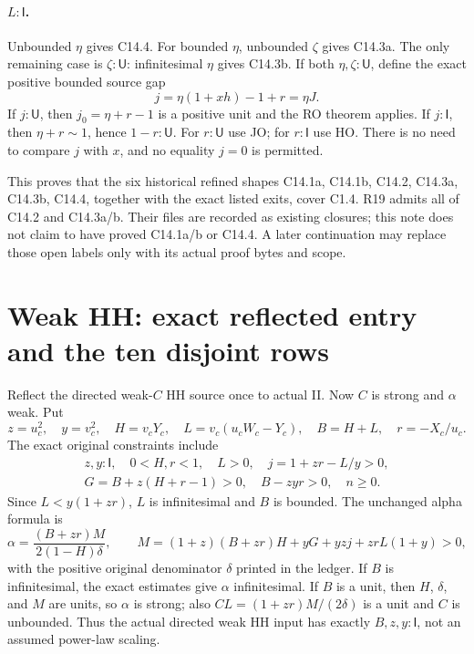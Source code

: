 \documentclass[11pt]{article}
\newcommand{\I}{\mathsf I}
\newcommand{\U}{\mathsf U}
\begin{document}
\paragraph{$L:\I$.}
Unbounded $\eta$ gives C14.4. For bounded $\eta$, unbounded $\zeta$
gives C14.3a. The only remaining case is $\zeta:\U$: infinitesimal
$\eta$ gives C14.3b. If both $\eta,\zeta:\U$, define the exact
positive bounded source gap
\[
j=\eta(1+xh)-1+r=\eta J.
\]
If $j:\U$, then $j_0=\eta+r-1$ is a positive unit and the RO theorem
applies. If $j:\I$, then $\eta+r\sim1$, hence $1-r:\U$.
For $r:\U$ use JO; for $r:\I$ use HO. There is no need to compare
$j$ with $x$, and no equality $j=0$ is permitted.

This proves that the six historical refined shapes
C14.1a, C14.1b, C14.2, C14.3a, C14.3b, C14.4, together with the exact
listed exits, cover C1.4. R19 admits all of C14.2 and C14.3a/b.
Their files are recorded as existing closures; this note does not claim
to have proved C14.1a/b or C14.4. A later continuation may replace
those open labels only with its actual proof bytes and scope.

\section{Weak HH: exact reflected entry and the ten disjoint rows}

Reflect the directed weak-$C$ HH source once to actual II. Now $C$
is strong and $\alpha$ weak. Put
\[
z=u_c^2,\quad y=v_c^2,\quad H=v_cY_c,\quad
L=v_c(u_cW_c-Y_c),\quad B=H+L,\quad r=-X_c/u_c.
\]
The exact original constraints include
\begin{gather*}
z,y:\I,\quad 0<H,r<1,\quad L>0,\quad j=1+zr-L/y>0,\\
G=B+z(H+r-1)>0,\quad B-zyr>0,\quad n\ge0.
\end{gather*}
Since $L<y(1+zr)$, $L$ is infinitesimal and $B$ is bounded.
The unchanged alpha formula is
\[
\alpha=\frac{(B+zr)M}{2(1-H)\delta},\qquad
M=(1+z)(B+zr)H+yG+yzj+zrL(1+y)>0,
\]
with the positive original denominator $\delta$ printed in the ledger.
If $B$ is infinitesimal, the exact estimates give $\alpha$ infinitesimal.
If $B$ is a unit, then $H$, $\delta$, and $M$ are units, so $\alpha$
is strong; also $CL=(1+zr)M/(2\delta)$ is a unit and $C$ is
unbounded. Thus the actual directed weak HH input has exactly
$B,z,y:\I$, not an assumed power-law scaling.
\end{document}
